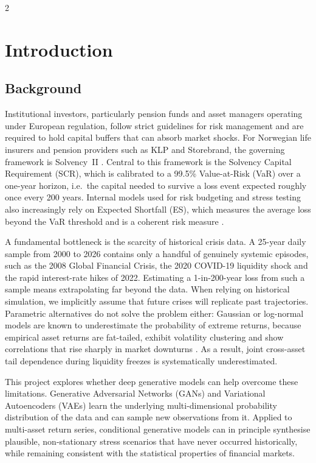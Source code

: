 \documentclass[12pt]{spieman}  %
\begin{document}
\begin{spacing}{2}   %

\section{Introduction}
\label{sect:intro}

\subsection{Background}
\label{sect:background}

Institutional investors, particularly pension funds and asset managers operating under European regulation, follow strict guidelines for risk management and are required to hold capital buffers that can absorb market shocks. For Norwegian life insurers and pension providers such as KLP and Storebrand, the governing framework is Solvency~II \cite{SolvencyII, Regjeringen08}. Central to this framework is the Solvency Capital Requirement (SCR), which is calibrated to a 99.5\% Value-at-Risk (VaR) over a one-year horizon, i.e.\ the capital needed to survive a loss event expected roughly once every 200 years. Internal models used for risk budgeting and stress testing also increasingly rely on Expected Shortfall (ES), which measures the average loss beyond the VaR threshold and is a coherent risk measure \cite{Artzner99}.

A fundamental bottleneck is the scarcity of historical crisis data. A 25-year daily sample from 2000 to 2026 contains only a handful of genuinely systemic episodes, such as the 2008 Global Financial Crisis, the 2020 COVID-19 liquidity shock and the rapid interest-rate hikes of 2022. Estimating a 1-in-200-year loss from such a sample means extrapolating far beyond the data. When relying on historical simulation, we implicitly assume that future crises will replicate past trajectories. Parametric alternatives do not solve the problem either: Gaussian or log-normal models are known to underestimate the probability of extreme returns, because empirical asset returns are fat-tailed, exhibit volatility clustering and show correlations that rise sharply in market downturns \cite{Cont01}. As a result, joint cross-asset tail dependence during liquidity freezes is systematically underestimated.

This project explores whether deep generative models can help overcome these limitations. Generative Adversarial Networks (GANs) \cite{Goodfellow14} and Variational Autoencoders (VAEs) \cite{KingmaWelling14} learn the underlying multi-dimensional probability distribution of the data and can sample new observations from it. Applied to multi-asset return series, conditional generative models can in principle synthesise plausible, non-stationary stress scenarios that have never occurred historically, while remaining consistent with the statistical properties of financial markets.


\end{spacing}
\end{document}
